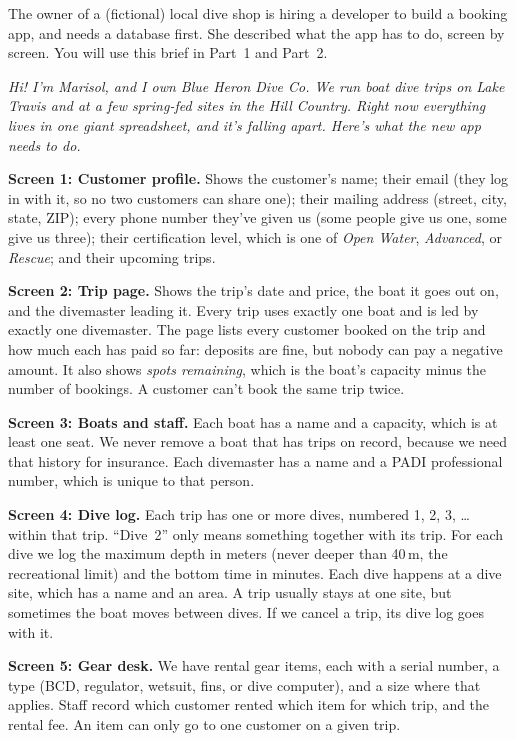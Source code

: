 \documentclass[11pt]{article}
\begin{document}
The owner of a (fictional) local dive shop is hiring a developer to build a booking app, and
needs a database first. She described what the app has to do, screen by screen. You will use
this brief in Part~1 and Part~2.

\begin{briefbox}
\textit{Hi! I'm Marisol, and I own Blue Heron Dive Co. We run boat dive trips on Lake Travis and
at a few spring-fed sites in the Hill Country. Right now everything lives in one giant
spreadsheet, and it's falling apart. Here's what the new app needs to do.}

\medskip
\textbf{Screen 1: Customer profile.}
Shows the customer's name; their email (they log in with it, so no two customers can share one);
their mailing address (street, city, state, ZIP); every phone number they've given us (some people
give us one, some give us three); their certification level, which is one of
\emph{Open Water}, \emph{Advanced}, or \emph{Rescue}; and their upcoming trips.

\medskip
\textbf{Screen 2: Trip page.}
Shows the trip's date and price, the boat it goes out on, and the divemaster leading it. Every trip
uses exactly one boat and is led by exactly one divemaster. The page lists every customer booked on
the trip and how much each has paid so far: deposits are fine, but nobody can pay a negative amount.
It also shows \emph{spots remaining}, which is the boat's capacity minus the number of bookings.
A customer can't book the same trip twice.

\medskip
\textbf{Screen 3: Boats and staff.}
Each boat has a name and a capacity, which is at least one seat. We never remove a boat that has
trips on record, because we need that history for insurance. Each divemaster has a name and a PADI
professional number, which is unique to that person.

\medskip
\textbf{Screen 4: Dive log.}
Each trip has one or more dives, numbered 1, 2, 3, \ldots{} within that trip. ``Dive~2'' only means
something together with its trip. For each dive we log the maximum depth in meters (never deeper
than 40\,m, the recreational limit) and the bottom time in minutes. Each dive happens at a dive site,
which has a name and an area. A trip usually stays at one site, but sometimes the boat moves between
dives. If we cancel a trip, its dive log goes with it.

\medskip
\textbf{Screen 5: Gear desk.}
We have rental gear items, each with a serial number, a type (BCD, regulator, wetsuit, fins, or dive
computer), and a size where that applies. Staff record which customer rented which item for which
trip, and the rental fee. An item can only go to one customer on a given trip.
\end{briefbox}
\end{document}
